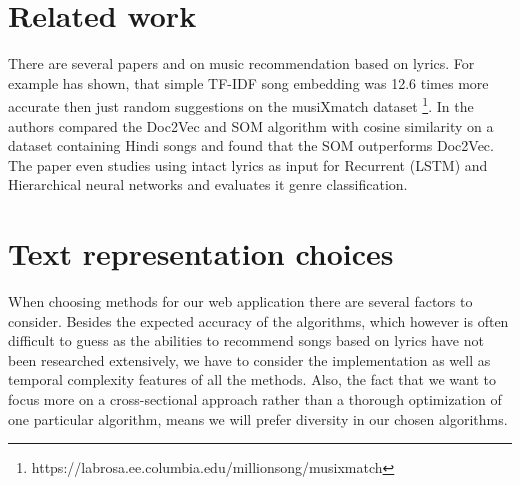 \section{Related work}\label{sec:text_related_work}
 There are several papers and on music recommendation based on lyrics. For example \cite{Gossi2016LyricBasedMR} has shown, that simple TF-IDF song embedding was 12.6 times more accurate then just random suggestions on the musiXmatch dataset \footnote{https://labrosa.ee.columbia.edu/millionsong/musixmatch}.  In \cite{inproceedings} the authors compared the Doc2Vec and SOM algorithm with cosine similarity on a dataset containing Hindi songs and found that the SOM outperforms Doc2Vec. The paper \cite{DBLP:journals/corr/Tsaptsinos17} even studies using intact lyrics as input for Recurrent (LSTM) and Hierarchical neural networks and evaluates it genre classification.
 
\section{Text representation choices}
When choosing methods for our web application there are several factors to consider. Besides the expected accuracy of the algorithms, which however is often difficult to guess as the abilities to recommend songs based on lyrics have not been researched extensively, we have to consider the implementation as well as temporal complexity features of all the methods. Also, the fact that we want to focus more on a cross-sectional approach rather than a thorough optimization of one particular algorithm, means we will prefer diversity in our chosen algorithms. \\


